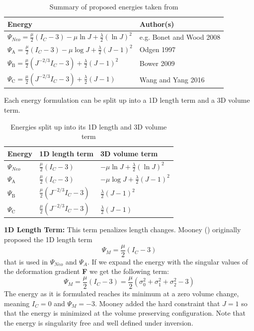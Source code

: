 \begin{table}[!htbp]
\centering
    \begin{tabular}{ | l | l |}
    \hline
    \textbf{Energy} & \textbf{Author(s)} \\ \hline
    $\Psi_{Neo}=\frac{\mu}{2}\left(I_{C}-3\right)-\mu \ln J+\frac{\lambda}{2}(\ln J)^{2}$ & e.g. Bonet and Wood 2008 \\ \hline
    $\Psi_{\mathrm{A}}=\frac{\mu}{2}\left(I_{C}-3\right)-\mu \log J+\frac{\lambda}{2}(J-1)^{2}$ & Odgen 1997 \\ \hline
    $\Psi_{\mathrm{B}}=\frac{\mu}{2}\left(J^{-2 / 3} I_{C}-3\right)+\frac{\lambda}{2}(J-1)^{2}$ & Bower 2009 \\ \hline
    $\Psi_{\mathrm{C}}=\frac{\mu}{2}\left(J^{-2 / 3} I_{C}-3\right)+\frac{\lambda}{2}(J-1)$ & Wang and Yang 2016 \\ \hline
    \end{tabular}
    \caption{Summary of proposed energies taken from \cite{Smith:2018:SNF:3191713.3180491}}
\label{table:1}
\end{table}

Each energy formulation can be split up into a 1D length term and a 3D volume term.

\begin{table}[!htbp]
\centering
    \begin{tabular}{ | l | l | l |}
    \hline
    \textbf{Energy} & \textbf{1D length term} & \textbf{3D volume term} \\ \hline
    $\Psi_{Neo}$ & $\frac{\mu}{2}\left(I_{C}-3\right)$ & $-\mu \ln J+\frac{\lambda}{2}(\ln J)^{2}$ \\ \hline
    $\Psi_{\mathrm{A}}$ & $\frac{\mu}{2}\left(I_{C}-3\right)$ & $-\mu \log J+\frac{\lambda}{2}(J-1)^{2}$ \\ \hline
    $\Psi_{\mathrm{B}}$ & $\frac{\mu}{2}\left(J^{-2 / 3} I_{C}-3\right)$ & $\frac{\lambda}{2}(J-1)^{2}$ \\ \hline
    $\Psi_{\mathrm{C}}$ & $\frac{\mu}{2}\left(J^{-2 / 3} I_{C}-3\right)$ & $\frac{\lambda}{2}(J-1)$ \\ \hline
    \end{tabular}
    \caption{Energies split up into its 1D length and 3D volume term}
\label{table:1}
\end{table}

\textbf{1D Length Term:} This term penalizes length changes. Mooney (\cite{mooney1940theory}) originally proposed the 1D length term 
\[
\Psi_{M}=\frac{\mu}{2}\left(I_{C}-3\right)
\]
that is used in $\Psi_{Neo}$ and $\Psi_{A}$. If we expand the energy with the singular values of the deformation gradient \textbf{F} we get the following term:
\[
\Psi_{M}=\frac{\mu}{2}\left(I_{C}-3\right) = \frac{\mu}{2}\left(\sigma_{0}^2 + \sigma_{1}^2 + \sigma_{2}^2 - 3\right)
\]
The energy as it is formulated reaches its minimum at a zero volume change, meaning $I_{C}=0$ and $\Psi_{M}=-3$. Mooney added the hard constraint that $J=1$ so that the energy is minimized at the volume preserving configuration. Note that the energy is singularity free and well defined under inversion.

